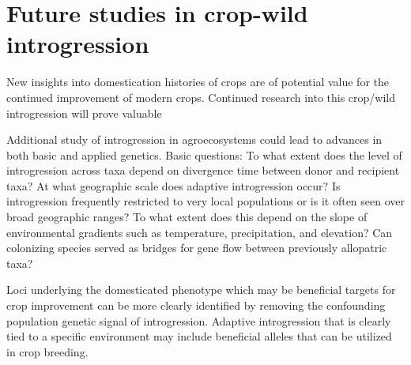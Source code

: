 \documentclass[11pt]{article}
\newcommand{\lwang}[1]{\textcolor{red}{ \emph{\scriptsize  #1}} } %
\newcommand{\gmj}[1]{\textcolor{blue}{ \emph{\scriptsize  #1}} } %
\begin{document}
\section*{Future studies in crop-wild introgression}

New insights into domestication histories of crops are of potential value for the continued improvement of modern crops.
Continued research into this crop/wild introgression will prove valuable 


Additional study of introgression in agroecosystems could lead to advances in both basic and applied genetics.
Basic questions:
To what extent does the level of introgression across taxa depend on divergence time between donor and recipient taxa? %
At what geographic scale does adaptive introgression occur? Is introgression frequently restricted to very local populations or is it often seen over broad geographic ranges? To what extent does this depend on the slope of environmental gradients such as temperature, precipitation, and elevation?%
Can colonizing species served as bridges for gene flow between previously allopatric taxa? %

Loci underlying the domesticated phenotype which may be beneficial targets for crop improvement can be more clearly identified by removing the confounding population genetic signal of introgression.
Adaptive introgression that is clearly tied to a specific environment may include beneficial alleles that can be utilized in crop breeding.








\end{document}
